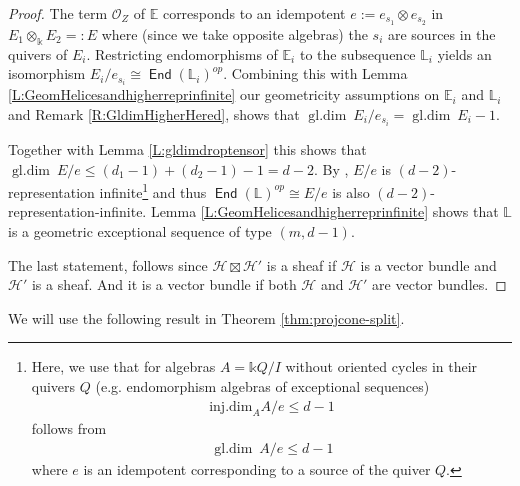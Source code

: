 \documentclass[a4paper,11pt, reqno]{amsart}
\def\E{\mathbb E}
\def\L{\mathbb L}
\def\sH{\mathscr{H}}
\def\gldim{{\operatorname{gl.dim}\ }}
\newcommand{\opname}[1]{\operatorname{\mathsf{#1}}}
\newcommand{\End}{\opname{End}}
\newcommand{\op}{^{op}}
\theoremstyle{plain}
\theoremstyle{definition}
\numberwithin{equation}{section}
\begin{document}
\begin{proof}
The term $\mathcal{O}_Z$ of $\E$ corresponds to an idempotent $e:=e_{s_1} \otimes e_{s_2}$ in  
$E_1 \otimes_{\mathbb{k}}E_2=:E $ where (since we take opposite algebras) the $s_i$ are sources in the quivers of $E_i$. Restricting endomorphisms of $\E_i$ to the subsequence $\L_i$ yields an isomorphism $E_i/e_{s_i} \cong \End(\L_i)\op$. Combining this with Lemma \ref {L:GeomHelicesandhigherreprinfinite} our geometricity assumptions on $\E_i$ and $\L_i$ and Remark \ref{R:GldimHigherHered}, shows that $\gldim E_i/e_{s_i} = \gldim E_i-1$.

Together with Lemma \ref{L:gldimdroptensor} this shows that $\gldim E/e \leq (d_1 -1) + (d_2 -1) -1 =d-2$. By \cite[Theorem 2.3]{Hanihara2}, $E/e$ is $(d -2)$-representation infinite\footnote{Here, we use that for algebras $A=\mathbb{k} Q/I$ without oriented cycles in their quivers $Q$ (e.g. endomorphism algebras of exceptional sequences) \cite[Assumption 2.2(2)]{Hanihara2}
\begin{align}
\mathrm{inj.dim}_A A/e\leq d-1
\end{align}
follows from 
\begin{align}
\gldim A/e\leq d-1
\end{align}
where $e$ is an idempotent corresponding to a source of the quiver $Q$.
}
and thus $\End(\L)\op \cong E/e$ is also $(d-2)$-representation-infinite.  Lemma \ref{L:GeomHelicesandhigherreprinfinite} shows that $\L$ is a geometric exceptional sequence of type $(m, d-1)$. 



The last statement, follows since $\sH \boxtimes \sH'$ is a sheaf if $\sH$ is a vector bundle and $\sH'$ is a sheaf. And it is a vector bundle if both $\sH$ and $\sH'$ are vector bundles.
\end{proof}







We will use the following result in Theorem \ref{thm:projcone-split}.
\end{document}
